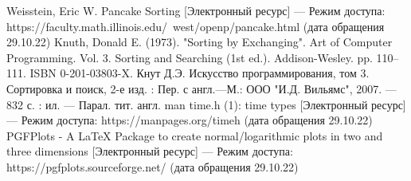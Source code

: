 \begin{thebibliography}{}
	 Weisstein, Eric W. Pancake Sorting [Электронный ресурс] --- Режим доступа: https://faculty.math.illinois.edu/~west/openp/pancake.html (дата обращения 29.10.22)
	 Knuth, Donald E. (1973). "Sorting by Exchanging". Art of Computer Programming. Vol. 3. Sorting and Searching (1st ed.). Addison-Wesley. pp. 110--111. ISBN 0-201-03803-X.
	 Кнут Д.Э. Искусство программирования, том 3. Сортировка и поиск, 2-е изд. : Пер. с англ.\text{~}---\text{~}М.: ООО "И.Д. Вильямс", 2007. ---  832 с. : ил.  --- Парал. тит. англ.
	 man time.h (1): time types [Электронный ресурс] --- Режим доступа: https://manpages.org/timeh (дата обращения 29.10.22)
	 PGFPlots - A LaTeX Package to create normal/logarithmic plots in two and three dimensions [Электронный ресурс] --- Режим доступа: https://pgfplots.sourceforge.net/ (дата обращения 29.10.22)
\end{thebibliography}
